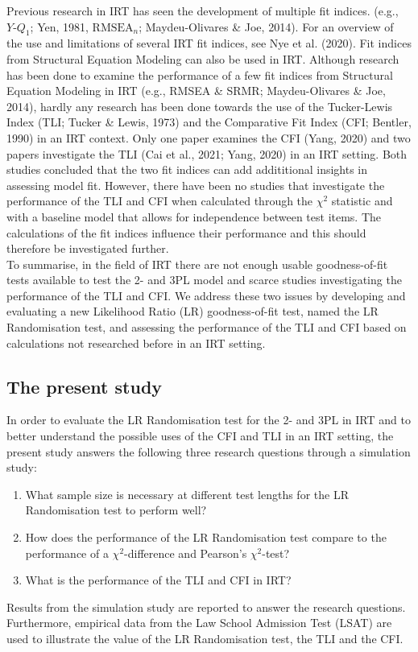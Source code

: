 \documentclass[Royal,sageapa,times,doublespace]{Manuscript-Files/sagej}
\begin{document}
\indent Previous research in IRT has seen the development of multiple fit indices. (e.g., $Y\text{-}Q_1$; Yen, 1981, $\text{RMSEA}_n$; Maydeu-Olivares \& Joe, 2014). For an overview of the use and limitations of several IRT fit indices, see Nye et al. (2020). Fit indices from Structural Equation Modeling can also be used in IRT. Although research has been done to examine the performance of a few fit indices from Structural Equation Modeling in IRT (e.g., RMSEA \& SRMR; Maydeu-Olivares \& Joe, 2014), hardly any research has been done towards the use of the Tucker-Lewis Index (TLI; Tucker \& Lewis, 1973) and the Comparative Fit Index (CFI; Bentler, 1990) in an IRT context. Only one paper examines the CFI (Yang, 2020) and two papers investigate the TLI (Cai et al., 2021; Yang, 2020) in an IRT setting. Both studies concluded that the two fit indices can add addititional insights in assessing model fit. However, there have been no studies that investigate the performance of the TLI and CFI when calculated through the $\chi^2$ statistic and with a baseline model that allows for independence between test items. The calculations of the fit indices influence their performance and this should therefore be investigated further. \\
\indent To summarise, in the field of IRT there are not enough usable goodness-of-fit tests available to test the 2- and 3PL model and scarce studies investigating the performance of the TLI and CFI. We address these two issues by developing and evaluating a new Likelihood Ratio (LR) goodness-of-fit test, named the LR Randomisation test, and assessing the performance of the TLI and CFI based on calculations not researched before in an IRT setting.  

\subsection{The present study}
In order to evaluate the LR Randomisation test for the 2- and 3PL in IRT and to better understand the possible uses of the CFI and TLI in an IRT setting, the present study answers the following three research questions through a simulation study:
\begin{enumerate}
\item{What sample size is necessary at different test lengths for the LR Randomisation test to perform well?}
\item{How does the performance of the LR Randomisation test compare to the performance of a $\chi^2$-difference and Pearson's $\chi^2$-test?}
\item{What is the performance of the TLI and CFI in IRT?}
\end{enumerate}
Results from the simulation study are reported to answer the research questions. Furthermore, empirical data from the Law School Admission Test (LSAT) are used to illustrate the value of the LR Randomisation test, the TLI and the CFI.
\end{document}
